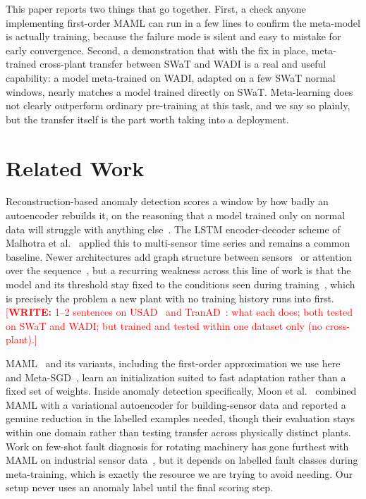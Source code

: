 \documentclass[conference]{IEEEtran}
\newcommand{\authorwrite}[1]{\textcolor{red}{[\textbf{WRITE:} #1]}}
\begin{document}
This paper reports two things that go together. First, a check anyone
implementing first-order MAML can run in a few lines to confirm the
meta-model is actually training, because the failure mode is silent and
easy to mistake for early convergence. Second, a demonstration that with the
fix in place, meta-trained cross-plant transfer between SWaT and WADI is a
real and useful capability: a model meta-trained on WADI, adapted on a few
SWaT normal windows, nearly matches a model trained directly on SWaT.
Meta-learning does not clearly outperform ordinary pre-training at this
task, and we say so plainly, but the transfer itself is the part worth
taking into a deployment.

\section{Related Work}

Reconstruction-based anomaly detection scores a window by how badly an
autoencoder rebuilds it, on the reasoning that a model trained only on
normal data will struggle with anything else~\cite{pang2021}. The LSTM
encoder-decoder scheme of Malhotra et al.~\cite{malhotra2016} applied this
to multi-sensor time series and remains a common baseline. Newer
architectures add graph structure between sensors~\cite{deng2021} or
attention over the sequence~\cite{chen2022}, but a recurring weakness across
this line of work is that the model and its threshold stay fixed to the
conditions seen during training~\cite{correia2024}, which is precisely the
problem a new plant with no training history runs into first.
\authorwrite{1--2 sentences on USAD~\cite{audibert2020} and TranAD~\cite{tuli2022}: what each does; both tested on SWaT and WADI; but trained and tested within one dataset only (no cross-plant).}

MAML~\cite{finn2017} and its variants, including the first-order
approximation we use here~\cite{antoniou2019} and Meta-SGD~\cite{li2017},
learn an initialization suited to fast adaptation rather than a fixed set of
weights. Inside anomaly detection specifically, Moon et al.~\cite{moon2023}
combined MAML with a variational autoencoder for building-sensor data and
reported a genuine reduction in the labelled examples needed, though their
evaluation stays within one domain rather than testing transfer across
physically distinct plants. Work on few-shot fault diagnosis for rotating
machinery has gone furthest with MAML on industrial sensor
data~\cite{zhang2021}, but it depends on labelled fault classes during
meta-training, which is exactly the resource we are trying to avoid needing.
Our setup never uses an anomaly label until the final scoring step.
\end{document}
